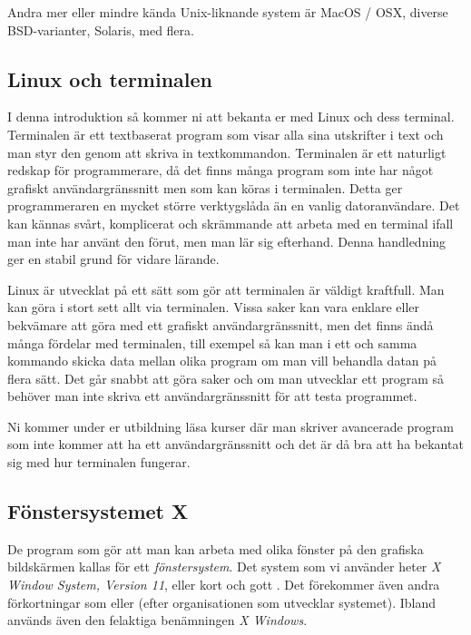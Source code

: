 \documentclass[a4paper,twocolumn]{book}
\begin{document}
Andra mer eller mindre kända Unix-liknande system är MacOS / OSX, diverse BSD-varianter,
Solaris, med flera.

\subsection{Linux och terminalen}

I denna introduktion så kommer ni att bekanta er med Linux och dess terminal.
Terminalen är ett textbaserat program som visar alla sina utskrifter i text
och man styr den genom att skriva in textkommandon.
Terminalen är ett naturligt redskap för programmerare, då det finns många program
som inte har något grafiskt användargränssnitt men som kan köras i terminalen. Detta ger programmeraren en mycket större verktygslåda än en vanlig datoranvändare.
Det kan kännas svårt, komplicerat och skrämmande att arbeta med en terminal ifall man inte har använt den förut, men man lär sig efterhand. Denna handledning ger en stabil grund för vidare lärande.

Linux är utvecklat på ett sätt som gör att terminalen är väldigt kraftfull.
Man kan göra i stort sett allt via terminalen. Vissa saker kan vara enklare
eller bekvämare att göra med ett grafiskt användargränssnitt, men det finns ändå
många fördelar med terminalen, till exempel så kan man i ett och samma kommando skicka data
mellan olika program om man vill behandla datan på flera sätt. Det går snabbt att
göra saker och om man utvecklar ett program så behöver man inte skriva ett
användargränssnitt för att testa programmet.

Ni kommer under er utbildning läsa kurser där man skriver avancerade program som
inte kommer att ha ett användargränssnitt och det är då bra att ha bekantat sig
med hur terminalen fungerar.

\subsection{Fönstersystemet X}

De program som gör att man kan arbeta med olika fönster på den
grafiska bildskärmen kallas för ett \emph{fönstersystem}. Det system
som vi använder heter \emph{X Window System, Version 11},
eller kort och gott . Det förekommer även andra
förkortningar som  eller  (efter organisationen
som utvecklar systemet). Ibland används
även den felaktiga benämningen \emph{X Windows}.
\end{document}
